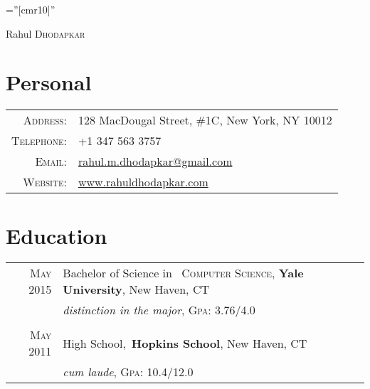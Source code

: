 \documentclass[a4paper,10pt]{article}
\begin{document}

\pagestyle{empty} %

\font\fb=''[cmr10]'' %

\par{\centering
		{\Huge Rahul \textsc{Dhodapkar}
	}\bigskip\par}

\section{Personal}

\begin{tabular}{rl}
    \textsc{Address:}   & 128 MacDougal Street, \#1C, New York, NY 10012 \\
    \textsc{Telephone:}      & +1 347 563 3757\\
    \textsc{Email:}       & \href{mailto:rahul.m.dhodapkar@gmail.com}{rahul.m.dhodapkar@gmail.com}\\
    \textsc{Website:}   & \href{http://www.rahuldhodapkar.com}{www.rahuldhodapkar.com}
\end{tabular}

\section{Education}
\begin{tabular}{rl}	
 \textsc{May} 2015 & Bachelor of Science in \
 \textsc{Computer Science}, \textbf{Yale University}, New Haven, CT\\
&\small\emph{distinction in the major}, \normalsize \textsc{Gpa}: 3.76/4.0\\
\\
\textsc{May} 2011 & High School,\
 \normalsize \textbf{Hopkins School}, New Haven, CT\\
&\small\emph{cum laude}, \normalsize \textsc{Gpa}: 10.4/12.0\\
\end{tabular}
\end{document}
